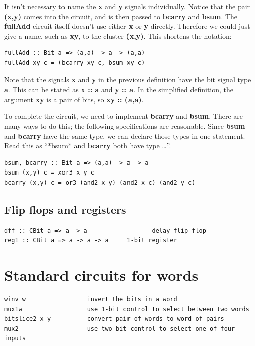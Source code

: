 \documentclass[]{svmono}
\begin{document}
It isn't necessary to name the \textbf{x} and \textbf{y} signals individually.
Notice that the pair \textbf{(x,y)} comes into the circuit, and is then
passed to \textbf{bcarry} and \textbf{bsum}.  The \textbf{fullAdd} circuit itself doesn't
use either \textbf{x} or \textbf{y} directly.  Therefore we could just give a name,
such as \textbf{xy}, to the cluster \textbf{(x,y)}.  This shortens the notation:


\begin{verbatim}
fullAdd :: Bit a => (a,a) -> a -> (a,a)
fullAdd xy c = (bcarry xy c, bsum xy c)
\end{verbatim}



Note that the signals \textbf{x} and \textbf{y} in the previous definition have the
bit signal type \textbf{a}.  This can be stated as \textbf{x :: a} and \textbf{y :: a}.  In
the simplified definition, the argument \textbf{xy} is a pair of bits, so \textbf{xy
:: (a,a)}.

To complete the circuit, we need to implement \textbf{bcarry} and \textbf{bsum}.
There are many ways to do this; the following specifications are
reasonable.  Since \textbf{bsum} and \textbf{bcarry} have the same type, we can
declare those types in one statement.  Read this as ``*bsum* and
\textbf{bcarry} both have type \ldots{}''.


\begin{verbatim}
bsum, bcarry :: Bit a => (a,a) -> a -> a
bsum (x,y) c = xor3 x y c
bcarry (x,y) c = or3 (and2 x y) (and2 x c) (and2 y c)
\end{verbatim}
\subsection*{Flip flops and registers}
\label{sec:org4283821}


\begin{verbatim}
dff :: CBit a => a -> a                  delay flip flop
reg1 :: CBit a => a -> a -> a     1-bit register
\end{verbatim}
\section*{Standard circuits for words}
\label{sec:org2d90ab1}


\begin{verbatim}
winv w                 invert the bits in a word
mux1w                  use 1-bit control to select between two words
bitslice2 x y          convert pair of words to word of pairs
mux2                   use two bit control to select one of four inputs
\end{verbatim}
\end{document}
